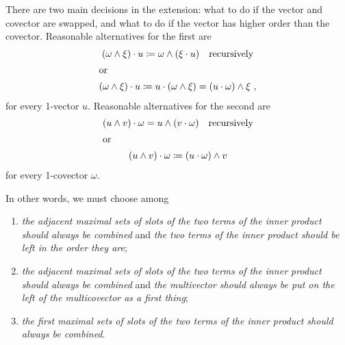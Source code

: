 \documentclass[\ifafour a4paper,12pt,\else a5paper,10pt,\fi%
onecolumn,oneside,article,%
british%
]{memoir}
\theoremstyle{remark}
\theoremstyle{innote}
\newcommand*{\defd}{\coloneqq}
\renewcommand*{\|}[1][]{\nonscript\,#1\vert\nonscript\;\mathopen{}}
\begin{document}
There are two main decisions in the extension: what to do if the vector and
covector are swapped, and what to do if the vector has higher order than
the covector. Reasonable alternatives for the first are
\begin{subequations}
    \label{eq:inner_swap_alternative}
  \begin{gather}
    \label{eq:inner_swap_alternative_right}
    (\omega \land \xi) \cdot u \defd \omega\land (\xi \cdot u)
    \quad\text{recursively}
    \\\shortintertext{or}
    \label{eq:inner_swap_alternative_left}
    (\omega \land \xi) \cdot u \defd
   u \cdot (\omega \land \xi) = (u \cdot \omega)\land \xi \ ,
  \end{gather}
\end{subequations}
for every 1-vector $u$. Reasonable alternatives for the second are
\begin{subequations}
    \label{eq:inner_multiv_alternative}
  \begin{gather}
    \label{eq:inner_multiv_alternative_right}
   (u \land v) \cdot \omega = u \land (v \cdot \omega)
    \quad\text{recursively}
    \\\shortintertext{or}
    \label{eq:inner_multiv_alternative_left}
   (u \land v) \cdot \omega \defd (u \cdot \omega) \land v
  \end{gather}
\end{subequations}
for every 1-covector $\omega$.

In other words, we must choose among
\begin{enumerate}[label=(I\arabic*)]
\item \emph{the adjacent maximal sets of slots of the two terms of the
    inner product should always be combined} and \emph{the two terms of the
    inner product should be left in the order they are};
\item \emph{the adjacent maximal sets of slots of the two terms of the
    inner product should always be combined} and \emph{the multivector
    should always be put on the left of the multicovector as a first
    thing};
\item \emph{the first maximal sets of slots of the two terms of the inner
    product should always be combined}.
\end{enumerate}
\end{document}
